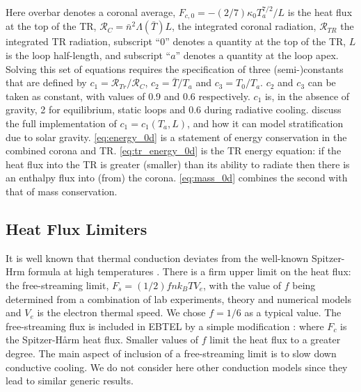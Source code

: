 \documentclass[apj]{emulateapj}
\begin{document}
Here overbar denotes a coronal average, $F_{c,0} = -(2/7)\kappa_0 T_a^{7/2}/L$ is the heat flux at the top of the TR, $\mathcal{R}_C=\bar{n}^2\Lambda(\bar{T})L$, the integrated coronal radiation, $\mathcal{R}_{TR}$ the integrated TR radiation, subscript ``0'' denotes a quantity at the top of the TR, $L$ is the loop half-length, and subscript ``$a$'' denotes a quantity at the loop apex. Solving this set of equations requires the specification of three (semi-)constants that are defined by  $c_1=\mathcal{R}_{Tr}/\mathcal{R}_C$, $c_2=\bar{T}/T_a$ and $c_3=T_0/T_a$. $c_2$ and $c_3$ can be taken as constant, with values of 0.9 and 0.6 respectively. $c_1$ is, in the absence of gravity, 2 for equilibrium, static loops and 0.6 during radiative cooling. \citet{cargill_enthalpy-based_2012} discuss the full implementation of $c_1 = c_1(T_a,L)$, and how it can model stratification due to solar gravity. \autoref{eq:energy_0d} is a statement of energy conservation in the combined corona and TR. \autoref{eq:tr_energy_0d} is the TR energy equation: if the heat flux into the TR is greater (smaller) than its ability to radiate then there is an enthalpy flux into (from) the corona. \autoref{eq:mass_0d} combines the second with that of mass conservation.
	
	\subsection{Heat Flux Limiters}
	\label{subsec:hf_theory}
	\par It is well known that thermal conduction deviates from the well-known Spitzer-H\a rm formula \citep{spitzer_transport_1953} at high temperatures \citep{ljepojevic_heat_1989}. There is a firm upper limit on the heat flux: the free-streaming limit, $F_s=(1/2)fnk_BTV_e$,  with the value of $f$ being determined from a combination of lab experiments, theory and numerical models and $V_e$ is the electron thermal speed. We chose $f = 1/6$ as a typical value. The free-streaming flux is included in EBTEL by a simple modification \citep{klimchuk_highly_2008}: where $F_c$ is the Spitzer-H\aa rm heat flux. Smaller values of $f$ limit the heat flux to a greater degree. The main aspect of inclusion of a free-streaming limit is to slow down conductive cooling. We do not consider here other conduction models \citep[e.g. the non-local model discussed in the coronal context by][]{karpen_nonlocal_1987,west_lifetime_2008} since they lead to similar generic results. 
\end{document}
